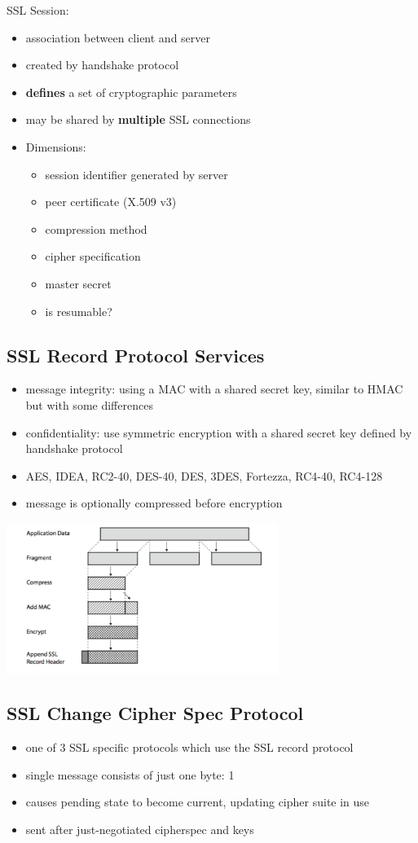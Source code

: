 \documentclass{article}
\begin{document}
SSL Session:
\begin{itemize}
    \item association between client and server
    \item created by handshake protocol
    \item \textbf{defines} a set of cryptographic parameters
    \item may be shared by \textbf{multiple} SSL connections
    \item Dimensions:
    \begin{itemize}
        \item session identifier generated by server
        \item peer certificate (X.509 v3)
        \item compression method
        \item cipher specification
        \item master secret
        \item is resumable?
    \end{itemize}
\end{itemize}
\subsection{SSL Record Protocol Services}
\begin{itemize}
    \item message integrity: using a MAC with a shared secret key, similar to HMAC but with some differences
    \item confidentiality: use symmetric encryption with a shared secret key defined by handshake protocol
    \item AES, IDEA, RC2-40, DES-40, DES, 3DES, Fortezza, RC4-40, RC4-128
    \item message is optionally compressed before encryption
\end{itemize}
\includegraphics[width= 250pt]{sslblock.png}
\subsection{SSL Change Cipher Spec Protocol}
\begin{itemize}
    \item one of 3 SSL specific protocols which use the SSL record protocol
    \item single message consists of just one byte: 1
    \item causes pending state to become current, updating cipher suite in use
    \item sent after just-negotiated cipherspec and keys
\end{itemize}
\end{document}
